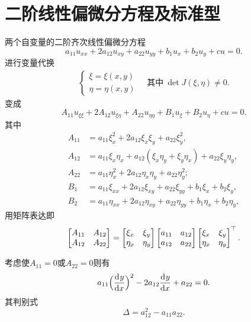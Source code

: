 \section{二阶线性偏微分方程及标准型}
两个自变量的二阶齐次线性偏微分方程
\[
	a_{11}u_{xx} + 2a_{12}u_{xy} + a_{22}u_{yy} + b_1u_x + b_2u_y + cu = 0.
\]
进行变量代换
\begin{align*}
	\begin{cases}
		\xi = \xi(x,y) \\
		\eta = \eta(x,y)
	\end{cases}
	\quad\text{其中}~
	\det J(\xi,\eta) \neq 0.
\end{align*}
变成
\[
	A_{11}u_{\xi\xi} + 2A_{12}u_{\xi\eta} + A_{22}u_{\eta\eta} + B_1u_\xi + B_2u_\eta + cu = 0.
\]
其中
\begin{align*}
	A_{11} & = a_{11}\xi_x^2 + 2a_{12}\xi_x\xi_y + a_{22}\xi_y^2,                          \\
	A_{12} & = a_{11}\xi_x\eta_x + a_{12}(\xi_x\eta_y + \xi_y\eta_x) + a_{22}\xi_y\eta_y, \\
	A_{22} & = a_{11}\eta_x^2 + 2 a_{12}\eta_x\eta_y + a_{22}\eta_y^2;                     \\
	B_1 & = a_{11}\xi_{xx} + 2a_{12}\xi_{xy} + a_{22}\xi_{yy} + b_1\xi_x + b_2\xi_y,        \\
	B_2 & = a_{11}\eta_{xx} + 2a_{12}\eta_{xy} + a_{22}\eta_{yy} + b_1\eta_x + b_2\eta_y,
\end{align*}
用矩阵表达即
\begin{align*}
	\begin{bmatrix}
		A_{11} & A_{12} \\
		A_{12} & A_{22}
	\end{bmatrix} = \begin{bmatrix}
		\xi_x  & \xi_y  \\
		\eta_x & \eta_y
	\end{bmatrix}\begin{bmatrix}
		a_{11} & a_{12} \\
		a_{12} & a_{22}
	\end{bmatrix}\begin{bmatrix}
		\xi_x  & \xi_y  \\
		\eta_x & \eta_y
	\end{bmatrix}^\top.
\end{align*}

考虑使$A_{11} = 0$或$A_{22} = 0$则有
\begin{equation}
	\label{eq:mmp-second-order-characteristics}
	a_{11}\Bigl(\frac{\mathop{}\!\mathrm{d}^{}y}{\mathrm{d}{x}^{}}\Bigr)^2 - 2a_{12}\frac{\mathop{}\!\mathrm{d}^{}y}{\mathrm{d}{x}^{}} + a_{22} = 0.
\end{equation}
其判别式
\begin{equation}
	\label{eq:mmp-pde-discriminant}
	\Delta = a_{12}^2 - a_{11}a_{22}.
\end{equation}
